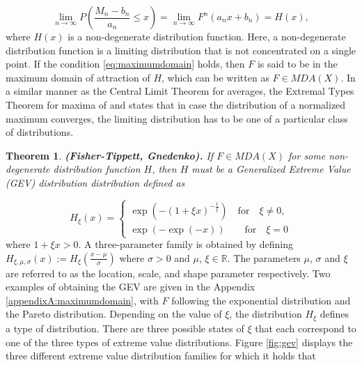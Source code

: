 \documentclass[a4paper,12pt]{article}
\theoremstyle{plain}
\newtheorem{thm}{Theorem}
\begin{document}
\begin{equation}
    \lim_{n\to\infty} P\left(\frac{M_n-b_n}{a_n}\leq x\right)=\lim_{n\to\infty}F^n\left(a_nx+b_n\right)=H\left(x\right),
    \label{eq:maximumdomain}
\end{equation}
where $H\left(x\right)$ is a non-degenerate distribution function. Here, a non-degenerate distribution function is a limiting distribution that is not concentrated on a single point. If the condition \eqref{eq:maximumdomain} holds, then $F$ is said to be in the maximum domain of attraction of $H$, which can be written as $F\in MDA\left(X\right)$. In a similar manner as the Central Limit Theorem for averages, the Extremal Types Theorem for maxima of  and  states that in case the distribution of a normalized maximum converges, the limiting distribution has to be one of a particular class of distributions.

\begin{thm}{\textbf{(Fisher-Tippett, Gnedenko).}}
    If $F\in MDA\left(X\right)$ for some non-degenerate distribution function $H$, then $H$ must be a Generalized Extreme Value (GEV) distribution distribution defined as
\end{thm}

\begin{equation}
    H_{\xi}(x) = \begin{cases}
               \exp{\left(-\left(1+\xi x\right)^{-\frac{1}{\xi}}\right)} \quad \textrm{for} \quad \xi\neq0,\\
              \exp{\left(-\exp{\left(-x\right)}\right)} \quad\quad \textrm{for} \quad \xi=0
            \end{cases}
\label{eq:GEV}
\end{equation}
where $1+\xi x > 0$. A three-parameter family is obtained by defining $H_{\xi, \mu, \sigma}\left(x\right):=H_{\xi}\left(\frac{x-\mu}{\sigma}\right)$ where $\sigma>0$ and $\mu$, $\xi \in \mathbb{R}$. The parameters $\mu$, $\sigma$ and $\xi$ are referred to as the location, scale, and shape parameter respectively. Two examples of obtaining the GEV are given in the Appendix \ref{appendixA:maximumdomain}, with $F$ following the exponential distribution and the Pareto distribution. Depending on the value of $\xi$, the distribution $H_\xi$ defines a type of distribution. There are three possible states of $\xi$ that each correspond to one of the three types of extreme value distributions. Figure \ref{fig:gev} displays the three different extreme value distribution families for which it holds that
\end{document}
